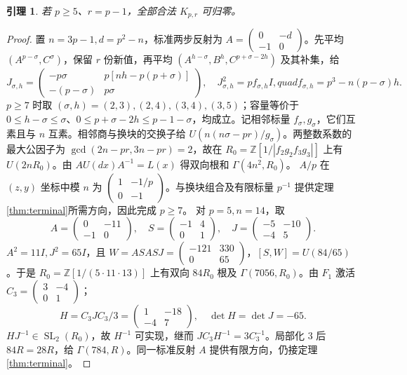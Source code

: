 \documentclass[11pt,a4paper]{article}
\newcommand{\Z}{\mathbb Z}
\newcommand{\SL}{\operatorname{SL}}
\newtheorem{lemma}[theorem]{引理}
\theoremstyle{definition}
\numberwithin{equation}{section}
\begin{document}
\begin{lemma}\label{lem:upper-boundary}
若 $p\ge5$、$r=p-1$，全部合法 $K_{p,r}$ 可归零。
\end{lemma}
\begin{proof}
置 $n=3p-1,d=p^2-n$，标准两步反射为 $A=\left(\begin{smallmatrix}0&-d\\-1&0\end{smallmatrix}\right)$。先平均 $(A^{p-\sigma},C^\sigma)$，保留 $r$ 份新值，再平均 $(A^{h-\sigma},B^h,C^{p+\sigma-2h})$ 及其补集，给
\[
J_{\sigma,h}=\begin{pmatrix}-p\sigma&p[nh-p(p+\sigma)]\\-(p-\sigma)&p\sigma\end{pmatrix},
\quad J_{\sigma,h}^2=pf_{\sigma,h}I,quad f_{\sigma,h}=p^3-n(p-\sigma)h.
\]
$p\ge7$ 时取 $(\sigma,h)=(2,3),(2,4),(3,4),(3,5)$；容量等价于 $0\le h-\sigma\le\sigma$、$0\le p+\sigma-2h\le p-1-\sigma$，均成立。记相邻标量 $f_\sigma,g_\sigma$，它们互素且与 $n$ 互素。相邻商与换块的交换子给 $U(n(n\sigma-pr)/g_\sigma)$。两整数系数的最大公因子为 $\gcd(2n-pr,3n-pr)=2$，故在 $R_0=\Z[1/|f_2g_2f_3g_3|]$ 上有 $U(2nR_0)$。由 $AU(dx)A^{-1}=L(x)$ 得双向根和 $\Gamma(4n^2,R_0)$。
$A/p$ 在 $(z,y)$ 坐标中模 $n$ 为 $\left(\begin{smallmatrix}1&-1/p\\0&-1\end{smallmatrix}\right)$。与换块组合及有限标量 $p^{-1}$ 提供定理\ref{thm:terminal}所需方向，因此完成 $p\ge7$。
对 $p=5,n=14$，取
\[
A=\begin{pmatrix}0&-11\\-1&0\end{pmatrix},\quad
S=\begin{pmatrix}-1&4\\0&1\end{pmatrix},\quad
J=\begin{pmatrix}-5&-10\\-4&5\end{pmatrix}.
\]
$A^2=11I,J^2=65I$，且 $W=ASASJ=\left(\begin{smallmatrix}-121&330\\0&65\end{smallmatrix}\right)$，$[S,W]=U(84/65)$。于是 $R_0=\Z[1/(5\cdot11\cdot13)]$ 上有双向 $84R_0$ 根及 $\Gamma(7056,R_0)$。由 $F_1$ 激活 $C_3=\left(\begin{smallmatrix}3&-4\\0&1\end{smallmatrix}\right)$；
\[
H=C_3JC_3/3=\begin{pmatrix}1&-18\\-4&7\end{pmatrix},\quad
\det H=\det J=-65.
\]
$HJ^{-1}\in\SL_2(R_0)$，故 $H^{-1}$ 可实现，继而 $JC_3H^{-1}=3C_3^{-1}$。局部化 $3$ 后 $84R=28R$，给 $\Gamma(784,R)$。同一标准反射 $A$ 提供有限方向，仍接定理\ref{thm:terminal}。
\end{proof}
\end{document}
